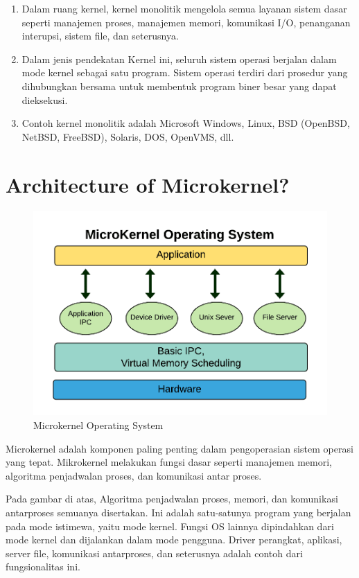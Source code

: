 \documentclass{report}
\begin{document}
	\begin{enumerate}
		\item Dalam ruang kernel, kernel monolitik mengelola semua layanan sistem dasar seperti manajemen proses, manajemen memori, komunikasi I/O, penanganan interupsi, sistem file, dan seterusnya.
		
		\item Dalam jenis pendekatan Kernel ini, seluruh sistem operasi berjalan dalam mode kernel sebagai satu program. Sistem operasi terdiri dari prosedur yang dihubungkan bersama untuk membentuk program biner besar yang dapat dieksekusi.
		
		\item Contoh kernel monolitik adalah Microsoft Windows, Linux, BSD (OpenBSD, NetBSD, FreeBSD), Solaris, DOS, OpenVMS, dll.
	\end{enumerate}

	\section*{Architecture of Microkernel?}

	\begin{figure}
		\centering
		\includegraphics[width=12cm]{Mikrokernel-1.png}
		\caption{Microkernel Operating System}
	\end{figure}
	
	Microkernel adalah komponen paling penting dalam pengoperasian sistem operasi yang tepat. Mikrokernel melakukan fungsi dasar seperti manajemen memori, algoritma penjadwalan proses, dan komunikasi antar proses.
	
	Pada gambar di atas, Algoritma penjadwalan proses, memori, dan komunikasi antarproses semuanya disertakan. Ini adalah satu-satunya program yang berjalan pada mode istimewa, yaitu mode kernel. Fungsi OS lainnya dipindahkan dari mode kernel dan dijalankan dalam mode pengguna. Driver perangkat, aplikasi, server file, komunikasi antarproses, dan seterusnya adalah contoh dari fungsionalitas ini.
	
\end{document}
